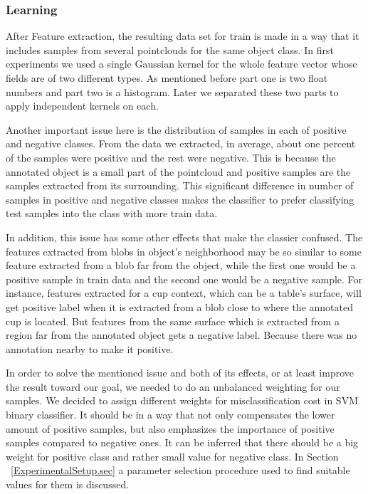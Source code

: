 \subsubsection{Learning}
\label{Learning.ssec}

After Feature extraction, the resulting data set for train is made in a way that it includes samples from several pointclouds 
for the same object class. 
In first experiments we used a single Gaussian kernel for the whole feature vector whose fields are of two different types. 
As mentioned before part one is two float numbers and part two is a histogram. 
Later we separated these two parts to apply independent kernels on each. 

Another important issue here is the distribution of samples in each of positive and negative classes. 
From the data we extracted, in average, about one percent of the samples were positive and the rest were negative.
This is because the annotated object is a small part of the pointcloud and positive samples are the samples extracted from its 
surrounding. 
This significant difference in number of samples in positive and negative classes makes the classifier to prefer classifying test samples into 
the class with more train data.

In addition, this issue has some other effects that make the classier confused. 
The features extracted from blobs in object's neighborhood may be so similar to some feature extracted from a blob far from the 
object, while the first one would be a positive sample in train data and the second one would be a negative sample. 
For instance, features extracted for a cup context, which can be a table's surface, will get positive label when it is extracted 
from a blob close to where the annotated cup is located. 
But features from the same surface which is extracted from a region far from the annotated object gets a negative label.
Because there was no annotation nearby to make it positive. 

In order to solve the mentioned issue and both of its effects, or at least improve the result toward our goal, we needed to do 
an unbalanced weighting for our samples. 
We decided to assign different weights for misclassification cost in SVM binary classifier. 
It should be in a way that not only compensates the lower amount of positive samples, but also emphasizes the importance of 
positive samples compared to negative ones. 
It can be inferred that there should be a big weight for positive class and rather small value for negative class.
In Section ~\ref{ExperimentalSetup.sec} a parameter selection procedure used to find suitable values for them is discussed.      

